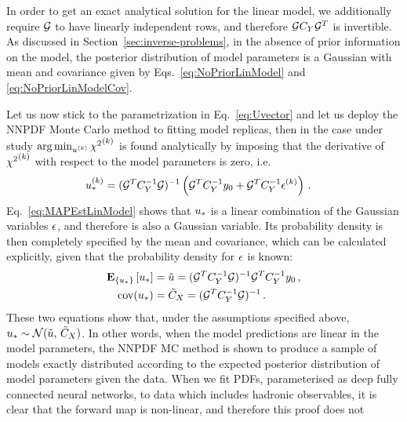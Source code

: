 In order to get an exact analytical solution for
the linear model, we additionally require $\mathcal{G}$ to have linearly independent
rows, and therefore $\mathcal{G} C_{Y} \mathcal{G}^T$ is invertible. As discussed in 
Section~\ref{sec:inverse-problems}, in the absence of 
prior information on the model, the posterior distribution of model parameters
is a Gaussian with mean and covariance given by Eqs.~\ref{eq:NoPriorLinModel}
and \ref{eq:NoPriorLinModelCov}.

Let us now stick to the parametrization in Eq.~\ref{eq:Uvector} and let us deploy 
the NNPDF Monte Carlo method to fitting model replicas,
then in the case under study $\arg\min_{u^{(k)}} {\chi^2}^{(k)}$ is found
analytically by imposing that the derivative of ${\chi^2}^{(k)}$ with respect to the
model parameters is zero, i.e.
\begin{equation}
    \begin{split}
        \label{eq:MAPEstLinModel}
        u_*^{(k)} &= (\mathcal{G}^T C_{Y}^{-1} \mathcal{G})^{-1}
        \left(
            \mathcal{G}^T C_{Y}^{-1} y_0 +
            \mathcal{G}^T C_{Y}^{-1} \epsilon^{(k)}
        \right) \, .
    \end{split}
\end{equation}
Eq.~\ref{eq:MAPEstLinModel} shows that $u_*$ is a linear combination of
the Gaussian variables $\epsilon$, and therefore is also a Gaussian variable. Its
probability density is then completely specified by the mean and covariance, which can be calculated explicitly, given that the probability
density for $\epsilon$ is known:
\begin{align}
    \mathbf{E}_{\{ u_* \}} \left[ u_* \right] &=
    \tilde{u} = (\mathcal{G}^T C_{Y}^{-1} \mathcal{G})^{-1} \mathcal{G}^T
    C_{Y}^{-1} y_0\, , \\
    {\rm cov}(u_*) &= \tilde{C}_X = (\mathcal{G}^T C_{Y}^{-1} \mathcal{G})^{-1} \, .
\end{align}
These two equations show that, under the assumptions specified above, $u_*
\sim \mathcal{N}(\tilde{u}, \, \tilde{C}_X)$. In other words, when the
model predictions are linear in the model parameters, the NNPDF MC method is
shown to produce a sample of models exactly distributed according to the expected 
posterior distribution of model
parameters given the data. When we fit PDFs, parameterised as deep fully
connected neural networks, to data which includes hadronic observables, it is
clear that the forward map is non-linear, and therefore this proof does not
